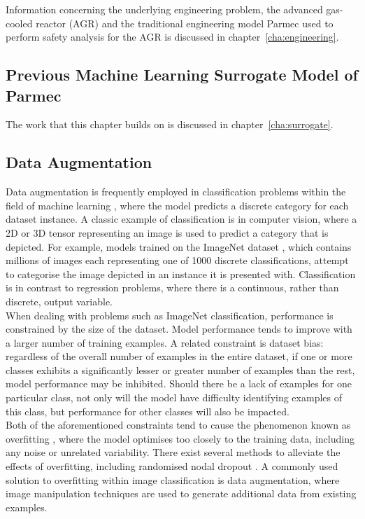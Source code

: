 Information concerning the underlying engineering problem, the advanced gas-cooled reactor (AGR) and the traditional engineering model Parmec used to perform safety analysis for the AGR is discussed in chapter~\ref{cha:engineering}.

\subsection{Previous Machine Learning Surrogate Model of Parmec} \label{previous}

The work that this chapter builds on is discussed in chapter~\ref{cha:surrogate}.

\subsection{Data Augmentation} \label{augmentation}


Data augmentation is frequently employed in classification problems within the field of machine learning \cite{shorten2019survey}, where the model predicts a discrete category for each dataset instance. A classic example of classification is in computer vision, where a 2D or 3D tensor representing an image is used to predict a category that is depicted. For example, models trained on the ImageNet dataset \cite{deng2009imagenet}, which contains millions of images each representing one of 1000 discrete classifications, attempt to categorise the image depicted in an instance it is presented with. Classification is in contrast to regression problems, where there is a continuous, rather than discrete, output variable.
\\

\noindent
When dealing with problems such as ImageNet classification, performance is constrained by the size of the dataset. Model performance tends to improve with a larger number of training examples. A related constraint is dataset bias: regardless of the overall number of examples in the entire dataset, if one or more classes exhibits a significantly lesser or greater number of examples than the rest, model performance may be inhibited. Should there be a lack of examples for one particular class, not only will the model have difficulty identifying examples of this class, but performance for other classes will also be impacted.
\\

\noindent
Both of the aforementioned constraints tend to cause the phenomenon known as overfitting \cite{hawkins2004problem}, where the model optimises too closely to the training data, including any noise or unrelated variability. There exist several methods to alleviate the effects of overfitting, including randomised nodal dropout \cite{srivastava2014dropout}. A commonly used solution to overfitting within image classification is data augmentation, where image manipulation techniques are used to generate additional data from existing examples. 
\\


